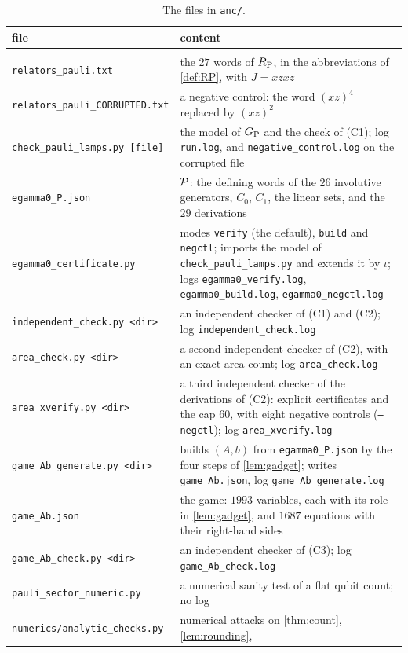 \begin{longtable}{@{}p{}p{}@{}}
\toprule
file & content \\
\midrule
\endhead
\bottomrule
\endfoot
\bottomrule
\caption{The files in \texttt{anc/}.}\label{cert:tab-files}\\
\endlastfoot
\texttt{relators\_pauli.txt} & the $27$ words of $R_{\mathrm P}$, in the abbreviations of \cref{def:RP}, with $J=xzxz$ \\
\texttt{relators\_pauli\_CORRUPTED.txt} & a negative control: the word $(xz)^4$ replaced by $(xz)^2$ \\
\texttt{check\_pauli\_lamps.py [file]} & \raggedright the model of $G_{\mathrm P}$ and the check of (C1); log \texttt{run.log}, and
\texttt{negative\_control.log} on the corrupted file \tabularnewline
\texttt{egamma0\_P.json} & \raggedright $\mathcal P$: the defining words of the $26$ involutive generators, $C_0$, $C_1$, the linear sets, and the
$29$ derivations \tabularnewline
\texttt{egamma0\_certificate.py} & \raggedright modes \texttt{verify} (the default), \texttt{build} and \texttt{negctl}; imports the model of
\texttt{check\_pauli\_lamps.py} and extends it by $\iota$; logs \texttt{egamma0\_verify.log}, \texttt{egamma0\_build.log},
\texttt{egamma0\_negctl.log} \tabularnewline
\texttt{independent\_check.py <dir>} & \raggedright an independent checker of (C1) and (C2); log \texttt{independent\_check.log}
\tabularnewline
\texttt{area\_check.py <dir>} & \raggedright a second independent checker of (C2), with an exact area count; log \texttt{area\_check.log}
\tabularnewline
\texttt{area\_xverify.py <dir>} & \raggedright a third independent checker of the derivations of (C2): explicit certificates and the cap
$60$, with eight negative controls (\texttt{--negctl}); log \texttt{area\_xverify.log} \tabularnewline
\texttt{game\_Ab\_generate.py <dir>} & \raggedright builds $(A,b)$ from \texttt{egamma0\_P.json} by the four steps of \cref{lem:gadget};
writes \texttt{game\_Ab.json}, log \texttt{game\_Ab\_generate.log} \tabularnewline
\texttt{game\_Ab.json} & \raggedright the game: $1993$ variables, each with its role in \cref{lem:gadget}, and $1687$ equations with their
right-hand sides \tabularnewline
\texttt{game\_Ab\_check.py <dir>} & \raggedright an independent checker of (C3); log \texttt{game\_Ab\_check.log} \tabularnewline
\texttt{pauli\_sector\_numeric.py} & a numerical sanity test of a flat qubit count; no log \\
\texttt{numerics/analytic\_checks.py} & \raggedright numerical attacks on \cref{thm:count}, \cref{lem:rounding},

\end{longtable}
